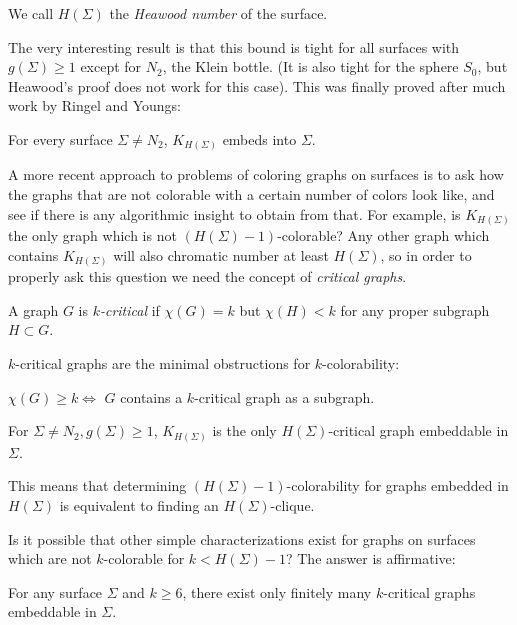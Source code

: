 We call $H(\Sigma)$ the \emph{Heawood number} of the surface.

The very interesting result is that this bound is tight for all surfaces with $g(\Sigma) \geq 1$
except for $N_2$, the Klein bottle. (It is also tight for the sphere $S_0$, but Heawood's proof
does not work for this case). This was finally proved after much work by Ringel and Youngs:

\begin{theorem}
For every surface $\Sigma \neq N_2$, $K_{H(\Sigma)}$ embeds into $\Sigma$.
\end{theorem}

A more recent approach to problems of coloring graphs on surfaces is to ask how the graphs
that are not colorable with a certain number of colors look like, and see if there is any 
algorithmic insight to obtain from that.
For example, is $K_{H(\Sigma)}$ the only graph which is not $(H(\Sigma)-1)$-colorable?
Any other graph which contains $K_{H(\Sigma)}$ will also chromatic number at least $H(\Sigma)$,
so in order to properly ask this question we need the concept of \emph{critical graphs}.

\begin{definition}
A graph $G$ is \emph{$k$-critical} if $\chi(G) = k$ but $\chi(H) < k$ for any proper subgraph
$H \subset G$. 
\end{definition}

$k$-critical graphs are the minimal obstructions for $k$-colorability:

\begin{observation}
$\chi(G) \geq k \iff$ $G$ contains a $k$-critical graph as a subgraph.
\end{observation}

\begin{theorem}
For $\Sigma \neq N_2, g(\Sigma) \geq 1$, $K_{H(\Sigma)}$ is the only $H(\Sigma)$-critical graph
embeddable in $\Sigma$.
\end{theorem}

This means that determining $(H(\Sigma)-1)$-colorability for graphs embedded in $H(\Sigma)$ is 
equivalent to finding an $H(\Sigma)$-clique. 

Is it possible that other simple characterizations exist for graphs on surfaces which are 
not $k$-colorable for $k < H(\Sigma)-1$? The answer is affirmative:

\begin{theorem}
For any surface $\Sigma$ and $k \geq 6$, there exist only finitely many $k$-critical graphs 
embeddable in $\Sigma$.
\end{theorem}

